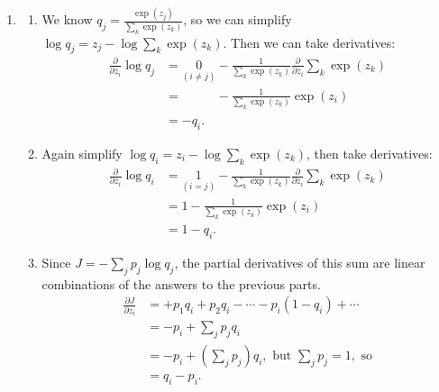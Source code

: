 \documentclass{article}
\begin{document}
\begin{enumerate}
\begin{enumerate}
\end{enumerate}

\item \label{DFN_gradientsimplification_solution}
\begin{enumerate}
    \item We know $q_j = \frac{\exp(z_j)}{\sum_k \exp(z_k)}$, so we can simplify $\log q_j = z_j - \log \sum_k \exp(z_k)$. Then we can take derivatives:
    \begin{align*}
        \frac{\partial}{\partial z_i} \log q_j 
        & = \underset{(i\neq j)}{0}           - \frac{1}{\sum_k \exp(z_k)} \frac{\partial}{\partial z_i} \sum_k \exp(z_k) \\
        & = \phantom{\underset{(i\neq j)}{0}} - \frac{1}{\sum_k \exp(z_k)} \exp(z_i) \\
        & = - q_i.
    \end{align*}
    \item Again simplify $\log q_i = z_i - \log \sum_k \exp(z_k)$, then take derivatives:
    \begin{align*}
        \frac{\partial}{\partial z_i} \log q_i 
        & = \underset{(i= j)}{1} - \frac{1}{\sum_k \exp(z_k)} \frac{\partial}{\partial z_i} \sum_k \exp(z_k) \\
        & = 1 - \frac{1}{\sum_k \exp(z_k)} \exp(z_i) \\
        & = 1 - q_i.
    \end{align*}
    \item Since $J = - \sum_j p_j \log q_j$, the partial derivatives of this sum are linear combinations of the answers to the previous parts.
    \begin{align*}
        \frac{\partial J}{\partial z_i} 
        & = +p_1q_i + p_2q_i - \cdots -p_i(1-q_i) + \cdots \\
        & = -p_i + \sum_j p_jq_i \\
        & = -p_i + \left(\sum_j p_j\right) q_i, \text{ but } \sum_j p_j = 1, \text{ so} \\
        & = q_i - p_i.   
    \end{align*}
\end{enumerate}


\end{enumerate}
\end{document}
